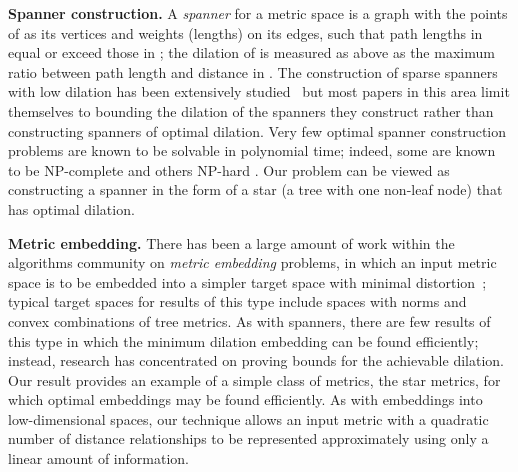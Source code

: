 \documentclass{llncs}
\begin{document}
\smallskip\noindent
{\bf Spanner construction.} A \emph{spanner} for a metric space  is a graph  with the points of  as its vertices and weights (lengths) on its edges, such that path lengths in  equal or exceed those in ; the dilation of  is measured as above as the maximum ratio between path length and distance in . The construction of sparse spanners with low dilation has been extensively studied~\cite{Epp-HCG-00} but most papers in this area limit themselves to bounding the dilation of the spanners they construct rather than constructing spanners of optimal dilation.  Very few optimal spanner construction problems are known to be solvable in polynomial time; indeed, some are known to be NP-complete \cite{klein_kutz} and others NP-hard \cite{1273697,edmonds_2008}. Our problem can be viewed as constructing a spanner in the form of a star (a tree with one non-leaf node) that has optimal dilation.

\smallskip\noindent
{\bf Metric embedding.} There has been a large amount of work within the algorithms community on \emph{metric embedding} problems, in which an input metric space is to be embedded into a simpler target space with minimal distortion~\cite{Lin-ICM-02}; typical target spaces for results of this type include spaces with  norms and convex combinations of tree metrics. As with spanners, there are few results of this type in which the minimum dilation embedding can be found efficiently; instead, research has concentrated on proving bounds for the achievable dilation. Our result provides an example of a simple class of metrics, the star metrics, for which optimal embeddings may be found efficiently. As with embeddings into low-dimensional  spaces, our technique allows an input metric with a quadratic number of distance relationships to be represented approximately using only a linear amount of information.
\end{document}
